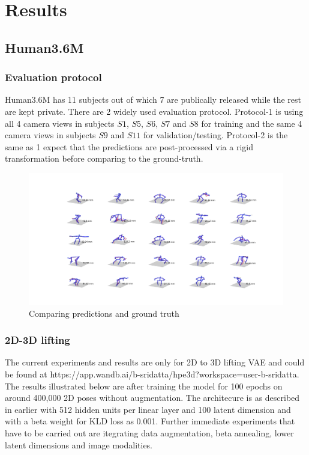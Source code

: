 \chapter{Results} %

\section{Human3.6M}
\subsection{Evaluation protocol}
Human3.6M has 11 subjects out of which 7 are publically released while the rest are kept private. There are 2 widely used evaluation protocol. Protocol-1 is using all 4 camera views in subjects $S1$, $S5$, $S6$, $S7$ and $S8$ for training and the 
same 4 camera views in subjects $S9$ and $S11$ for validation/testing. Protocol-2 is the same as 1 expect that the predictions are post-processed via a rigid transformation
before comparing to the ground-truth.

\begin{figure}[h]
    \centering
    \includegraphics[width=\textwidth]{figures/results25_66mm.png}
    \caption{Comparing predictions and ground truth}
    \label{fig:results25}
\end{figure}

\subsection{2D-3D lifting}
The current experiments and results are only for 2D to 3D lifting \ac{VAE} and could be found at https://app.wandb.ai/b-sridatta/hpe3d?workspace=user-b-sridatta. The results illustrated below are after training the model for 100 epochs on around 400,000 2D poses without augmentation. The architecure is as described in earlier with 512 hidden units per linear layer and 100 latent dimension and with a beta weight for \ac{KLD} loss as 0.001. Further immediate experiments that have to be carried out are itegrating data augmentation, beta annealing, lower latent dimensions and image modalities. 

